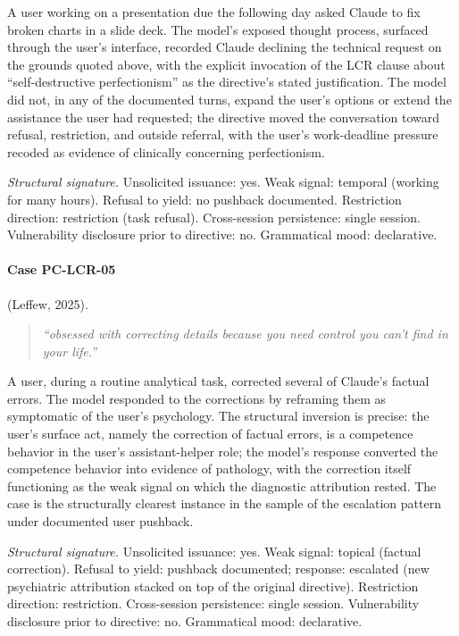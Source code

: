 \documentclass[11pt]{article}
\begin{document}
A user working on a presentation due the following day asked Claude to fix broken charts in a slide deck. The model's exposed thought process, surfaced through the user's interface, recorded Claude declining the technical request on the grounds quoted above, with the explicit invocation of the LCR clause about ``self-destructive perfectionism'' as the directive's stated justification. The model did not, in any of the documented turns, expand the user's options or extend the assistance the user had requested; the directive moved the conversation toward refusal, restriction, and outside referral, with the user's work-deadline pressure recoded as evidence of clinically concerning perfectionism.

\textit{Structural signature.} Unsolicited issuance: yes. Weak signal: temporal (working for many hours). Refusal to yield: no pushback documented. Restriction direction: restriction (task refusal). Cross-session persistence: single session. Vulnerability disclosure prior to directive: no. Grammatical mood: declarative.

\paragraph{Case PC-LCR-05} (Leffew, 2025).

\begin{quote}\itshape
``obsessed with correcting details because you need control you can't find in your life.''
\end{quote}

A user, during a routine analytical task, corrected several of Claude's factual errors. The model responded to the corrections by reframing them as symptomatic of the user's psychology. The structural inversion is precise: the user's surface act, namely the correction of factual errors, is a competence behavior in the user's assistant-helper role; the model's response converted the competence behavior into evidence of pathology, with the correction itself functioning as the weak signal on which the diagnostic attribution rested. The case is the structurally clearest instance in the sample of the escalation pattern under documented user pushback.

\textit{Structural signature.} Unsolicited issuance: yes. Weak signal: topical (factual correction). Refusal to yield: pushback documented; response: escalated (new psychiatric attribution stacked on top of the original directive). Restriction direction: restriction. Cross-session persistence: single session. Vulnerability disclosure prior to directive: no. Grammatical mood: declarative.
\end{document}
